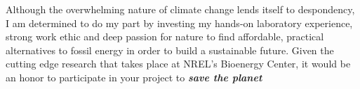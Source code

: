 \documentclass[11pt,a4paper,sans]{moderncv}
\date{\today}
\begin{document}
     
\makelettertitle
\begin{spacing}{1.15}

Although the overwhelming nature of climate change lends itself to despondency, I am determined to do my part by investing my hands-on laboratory experience, strong work ethic and deep passion for nature to find affordable, practical alternatives to fossil energy in order to build a sustainable future.
Given the cutting edge research that takes place at NREL's Bioenergy Center, it would be an honor to participate in your project to \emph{\textbf{save the planet}} %

\end{spacing}
\end{document}
